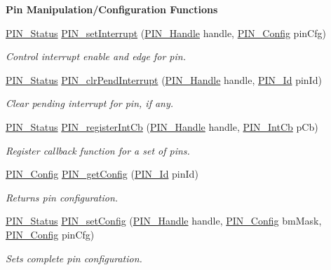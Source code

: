 \begin{Indent}{\bf Pin Manipulation/\+Configuration Functions}
\begin{DoxyCompactItemize}
\hyperlink{_p_i_n_8h_abe0ad59bbf09e51fe37195a5e70b23f6}{P\+I\+N\+\_\+\+Status} \hyperlink{_p_i_n_8h_a69e2aac02eaabf8d3c3a248a27dd7d0e}{P\+I\+N\+\_\+set\+Interrupt} (\hyperlink{_p_i_n_8h_afb2de52b054638f63c39df1f30a0d88d}{P\+I\+N\+\_\+\+Handle} handle, \hyperlink{_p_i_n_8h_ae427b7d2925f9b0f3145e455cfdb5841}{P\+I\+N\+\_\+\+Config} pin\+Cfg)
\begin{DoxyCompactList}\small\item\em Control interrupt enable and edge for pin. \end{DoxyCompactList}\item 
\hyperlink{_p_i_n_8h_abe0ad59bbf09e51fe37195a5e70b23f6}{P\+I\+N\+\_\+\+Status} \hyperlink{_p_i_n_8h_a82957789e7c370b6dd4f16fa36045522}{P\+I\+N\+\_\+clr\+Pend\+Interrupt} (\hyperlink{_p_i_n_8h_afb2de52b054638f63c39df1f30a0d88d}{P\+I\+N\+\_\+\+Handle} handle, \hyperlink{_p_i_n_8h_a9ae8197f460bb76ea09a84f47d09921f}{P\+I\+N\+\_\+\+Id} pin\+Id)
\begin{DoxyCompactList}\small\item\em Clear pending interrupt for pin, if any. \end{DoxyCompactList}\item 
\hyperlink{_p_i_n_8h_abe0ad59bbf09e51fe37195a5e70b23f6}{P\+I\+N\+\_\+\+Status} \hyperlink{_p_i_n_8h_ae906e3b4880c7c921c90d0baf0ce6e42}{P\+I\+N\+\_\+register\+Int\+Cb} (\hyperlink{_p_i_n_8h_afb2de52b054638f63c39df1f30a0d88d}{P\+I\+N\+\_\+\+Handle} handle, \hyperlink{_p_i_n_8h_a289cbfdcb1e23ade7c3b0f5fc3b2d695}{P\+I\+N\+\_\+\+Int\+Cb} p\+Cb)
\begin{DoxyCompactList}\small\item\em Register callback function for a set of pins. \end{DoxyCompactList}\item 
\hyperlink{_p_i_n_8h_ae427b7d2925f9b0f3145e455cfdb5841}{P\+I\+N\+\_\+\+Config} \hyperlink{_p_i_n_8h_aed24cb96de8fa957e9f7c05dd239f2f9}{P\+I\+N\+\_\+get\+Config} (\hyperlink{_p_i_n_8h_a9ae8197f460bb76ea09a84f47d09921f}{P\+I\+N\+\_\+\+Id} pin\+Id)
\begin{DoxyCompactList}\small\item\em Returns pin configuration. \end{DoxyCompactList}\item 
\hyperlink{_p_i_n_8h_abe0ad59bbf09e51fe37195a5e70b23f6}{P\+I\+N\+\_\+\+Status} \hyperlink{_p_i_n_8h_a4b9fbd1a86e63d2f14f679b87f17c857}{P\+I\+N\+\_\+set\+Config} (\hyperlink{_p_i_n_8h_afb2de52b054638f63c39df1f30a0d88d}{P\+I\+N\+\_\+\+Handle} handle, \hyperlink{_p_i_n_8h_ae427b7d2925f9b0f3145e455cfdb5841}{P\+I\+N\+\_\+\+Config} bm\+Mask, \hyperlink{_p_i_n_8h_ae427b7d2925f9b0f3145e455cfdb5841}{P\+I\+N\+\_\+\+Config} pin\+Cfg)
\begin{DoxyCompactList}\small\item\em Sets complete pin configuration. \end{DoxyCompactList}\end{DoxyCompactItemize}
\end{Indent}
